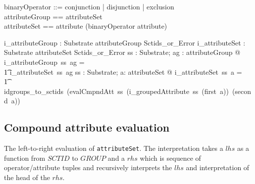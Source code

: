\documentclass{article}
\def\spec#1{{\tt #1}}
\begin{document}
\begin{zed}
binaryOperator  ::= conjunction | disjunction | exclusion \\
attributeGroup == attributeSet \\
attributeSet == attribute \cross \seq (binaryOperator \cross attribute) 
\end{zed}

\begin{gendef}
   i\_attributeGroup : Substrate \pfun attributeGroup \pfun Sctids\_or\_Error 
\also
   i\_attributeSet : Substrate \pfun attributeSet \pfun Sctids\_or\_Error 
\where
\forall ss : Substrate; ag : attributeGroup @ i\_attributeGroup~ss~ag = \\
\t1 i\_attributeSet~ss~ag
\also
\forall ss : Substrate; a: attributeSet @ i\_attributeSet~ss~a = \\
\t1 idgroups\_to\_sctids~(evalCmpndAtt~ss~(i\_groupedAttribute~ss~(first~a))~(second~a))
\end{gendef}

\subsection{Compound attribute evaluation}
The left-to-right evaluation of \spec{attributeSet}.  The interpretation takes a $lhs$ as 
a function from $SCTID$ to $GROUP$ and a $rhs$ which is sequence of operator/attribute
tuples and recursively interprets the $lhs$ and interpretation of the head of the $rhs$.
\end{document}
